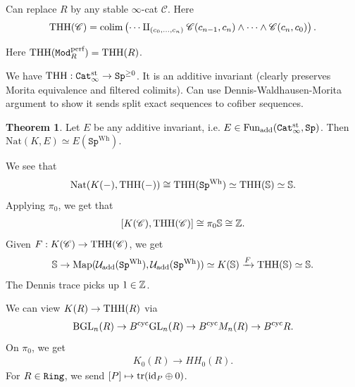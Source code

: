\documentclass[12pt]{amsart}
\theoremstyle{definition}
\newtheorem{theorem}{Theorem}[section]
\let\smashprod\wedge
\providecommand{\Sp}{\texttt{Sp}}
\providecommand{\Sp}{\text{Sp}}
\providecommand{\st}{\text{st}}
\providecommand{\Nat}{\text{Nat}}
\providecommand{\Wh}{\text{Wh}}
\providecommand{\add}{\text{add}}
\begin{document}
Can replace $R$ by any stable $\infty$-cat $\mathscr{C}$. Here
\begin{align*}
    \THH(\mathscr{C}) = \colim \left( \cdots \amalg_{(c_0, \ldots, c_n)} \mathscr{C}(c_{n-1},c_n) \smashprod \cdots \smashprod \mathscr{C}(c_n,c_0) \right).
\end{align*}

Here $\text{THH}(\texttt{Mod}_R^{\text{perf}}) = \text{THH}(R)$.

We have $\THH: \Cat_\infty^\st \to \Sp^{\ge 0}$. It is an additive invariant (clearly preserves Morita equivalence and filtered colimits). Can use Dennis-Waldhausen-Morita argument to show it sends split exact sequences to cofiber sequences.


\begin{theorem} Let $E$ be any additive invariant, i.e. $E\in \Fun_\add(\Cat_\infty^\st, \Sp)$. Then $\Nat(K,E) \simeq E(\Sp^\Wh)$.
\end{theorem}

We see that
\begin{align*}
    \Nat(K(-),\THH(-)) \cong \THH(\Sp^\Wh) \simeq \THH(\mathbb{S}) \simeq \mathbb{S}.
\end{align*}
Applying $\pi_0$, we get that
\begin{align*}
    \left[ K(\mathscr{C}), \text{THH}(\mathscr{C}) \right] \cong \pi_0 \mathbb{S} \cong \mathbb{Z}.
\end{align*}
Given $F: K(\mathscr{C}) \to \text{THH}(\mathscr{C})$, we get
\begin{align*}
    \mathbb{S} \to \Map(\mathcal{U}_\add(\Sp^\Wh), \mathcal{U}_\add(\Sp^\Wh)) \simeq K(\mathbb{S}) \xto{F} \THH(\mathbb{S}) \simeq \mathbb{S}.
\end{align*}
The Dennis trace picks up $1\in \mathbb{Z}$.

We can view $K(R) \to \text{THH}(R)$ via
\begin{align*}
    \text{BGL}_n(R) \to B^{\text{cyc}} \text{GL}_n(R) \to B^{\text{cyc}} M_n(R) \to B^{\text{cyc}} R.
\end{align*}
On $\pi_0$, we get
\begin{align*}
    K_0(R) \to HH_0(R).
\end{align*}
For $R\in \texttt{Ring}$, we send $[P]\mapsto \text{tr}(\text{id}_P \oplus 0)$. 





\newpage

{}
\end{document}
